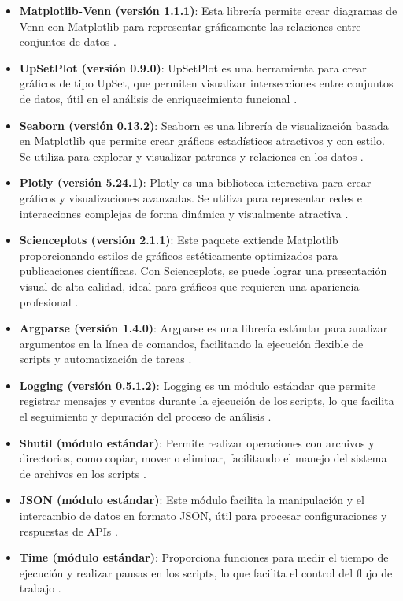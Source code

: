 \begin{itemize}
	\item \textbf{Matplotlib-Venn (versión 1.1.1)}: Esta librería permite crear diagramas de Venn con Matplotlib para representar gráficamente las relaciones entre conjuntos de datos \cite{matplotlibvenn}.
	\item \textbf{UpSetPlot (versión 0.9.0)}: UpSetPlot es una herramienta para crear gráficos de tipo UpSet, que permiten visualizar intersecciones entre conjuntos de datos, útil en el análisis de enriquecimiento funcional \cite{upsetplot}.
	\item \textbf{Seaborn (versión 0.13.2)}: Seaborn es una librería de visualización basada en Matplotlib que permite crear gráficos estadísticos atractivos y con estilo. Se utiliza para explorar y visualizar patrones y relaciones en los datos \cite{seaborn}.
	\item \textbf{Plotly (versión 5.24.1)}: Plotly es una biblioteca interactiva para crear gráficos y visualizaciones avanzadas. Se utiliza para representar redes e interacciones complejas de forma dinámica y visualmente atractiva \cite{plotly}.
	\item \textbf{Scienceplots (versión 2.1.1)}: Este paquete extiende Matplotlib proporcionando estilos de gráficos estéticamente optimizados para publicaciones científicas. Con Scienceplots, se puede lograr una presentación visual de alta calidad, ideal para gráficos que requieren una apariencia profesional \cite{scienceplots}.
	\item \textbf{Argparse (versión 1.4.0)}: Argparse es una librería estándar para analizar argumentos en la línea de comandos, facilitando la ejecución flexible de scripts y automatización de tareas \cite{argparse}.
	\item \textbf{Logging (versión 0.5.1.2)}: Logging es un módulo estándar que permite registrar mensajes y eventos durante la ejecución de los scripts, lo que facilita el seguimiento y depuración del proceso de análisis \cite{logging}.
	\item \textbf{Shutil (módulo estándar)}: Permite realizar operaciones con archivos y directorios, como copiar, mover o eliminar, facilitando el manejo del sistema de archivos en los scripts \cite{shutil}.
	\item \textbf{JSON (módulo estándar)}: Este módulo facilita la manipulación y el intercambio de datos en formato JSON, útil para procesar configuraciones y respuestas de APIs \cite{json}.
	\item \textbf{Time (módulo estándar)}: Proporciona funciones para medir el tiempo de ejecución y realizar pausas en los scripts, lo que facilita el control del flujo de trabajo \cite{time}.

\end{itemize}
